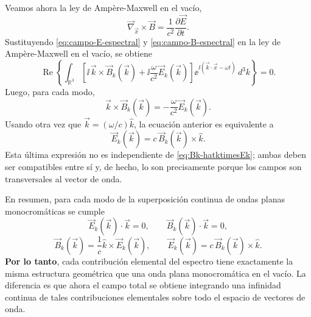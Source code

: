 \documentclass[../main.tex]{subfiles}
\begin{document}
Veamos ahora la ley de Ampère-Maxwell en el vacío,
\begin{equation*}
    \vec\nabla_{\vec x}\times \vec B=\frac{1}{c^2}\frac{\partial \vec E}{\partial t}.
\end{equation*}
Sustituyendo \eqref{eq:campo-E-espectral} y \eqref{eq:campo-B-espectral} en la ley de Ampère-Maxwell en el vacío, se obtiene
\begin{equation*}
    \operatorname{Re}\left\{
        \int_{\mathbb R^3}\left[\ii\,\vec k\times\vec B_k(\vec k)+\ii\frac{\omega}{c^2}\vec E_k(\vec k)\right]\ee^{\ii(\vec k\cdot\vec x-\omega t)}\,d^3k
    \right\}=0.
\end{equation*}
Luego, para cada modo,
\begin{equation*}
    \vec k\times\vec B_k(\vec k)=-\frac{\omega}{c^2}\vec E_k(\vec k).
\end{equation*}
Usando otra vez que $\vec k=(\omega/c)\hat k$, la ecuación anterior es equivalente a
\begin{equation*}
    \vec E_k(\vec k)=c\,\vec B_k(\vec k)\times\hat k.
\end{equation*}
Esta última expresión no es independiente de \eqref{eq:Bk-hatktimesEk}; ambas deben ser compatibles entre sí y, de hecho, lo son precisamente porque los campos son transversales al vector de onda.

En resumen, para cada modo de la superposición continua de ondas planas monocromáticas se cumple
\begin{equation*}
    \vec E_k(\vec k)\cdot\vec k=0,
    \qquad
    \vec B_k(\vec k)\cdot\vec k=0,
\end{equation*}
\begin{equation*}
    \vec B_k(\vec k)=\frac{1}{c}\hat k\times \vec E_k(\vec k),
    \qquad
    \vec E_k(\vec k)=c\,\vec B_k(\vec k)\times\hat k.
\end{equation*}
\textbf{Por lo tanto}, cada contribución elemental del espectro tiene exactamente la misma estructura geométrica que una onda plana monocromática en el vacío. La diferencia es que ahora el campo total se obtiene integrando una infinidad continua de tales contribuciones elementales sobre todo el espacio de vectores de onda.
\end{document}
